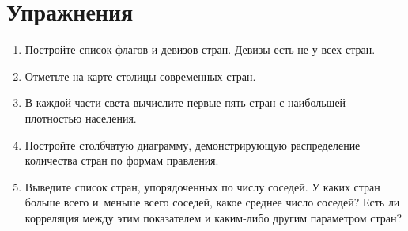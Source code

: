 \section{Упражнения}

\begin{enumerate}[noitemsep,topsep=0pt]
	\item Постройте список флагов и девизов стран. Девизы есть не у всех стран.
	\item Отметьте на карте столицы современных стран.
	\item В каждой части света вычислите первые пять стран с наибольшей плотностью населения.
	\item Постройте столбчатую диаграмму, демонстрирующую распределение количества стран по формам правления.
	\item Выведите список стран, упорядоченных по числу соседей. У каких стран больше всего и~меньше всего соседей, какое среднее число соседей? Есть ли корреляция между этим показателем и каким-либо другим параметром стран?
\end{enumerate}
